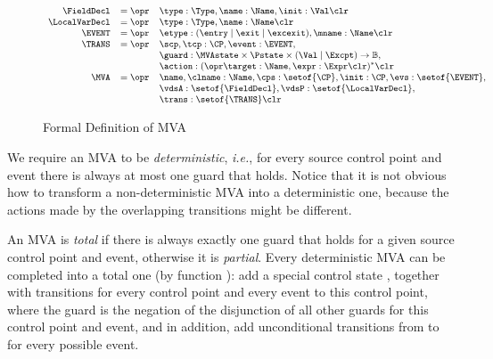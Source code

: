 \begin{figure}[t]
\[{\small
\begin{array}{rcl}
\FieldDecl & = \opr & \type : \Type, \name : \Name, \init : \Val
\clr \\
\LocalVarDecl & = \opr & \type : \Type, \name : \Name \clr \\
\EVENT & = \opr & \etype : (\entry \mid \exit \mid \excexit),
                 \mname : \Name \clr\\
\TRANS & = \opr & \scp, \tcp : \CP, \event : \EVENT, \\
& &
\guard : \MVAstate \times \Pstate \times (\Val \mid \Excpt) \rightarrow \mathbb{B}, \\
&& \action : (\opr \target : \Name, \expr : \Expr \clr)^* \clr\\
\MVA & = \opr & \name, \clname : \Name, \cps : \setof{\CP},
            \init : \CP, \evs : \setof{\EVENT},\\
     &   &  \vdsA : \setof{\FieldDecl}, \vdsP : \setof{\LocalVarDecl},\\
     &   &  \trans : \setof{\TRANS} \clr
\end{array}}
\]
\caption{Formal Definition of MVA}\label{FigMVAForm}
\end{figure}

We require an MVA to be \emph{deterministic}, \emph{i.e.}, for every
source control point and event there is always at most one guard that
holds. Notice that it is not obvious how to transform a
non-deterministic MVA into a deterministic one, because the actions
made by the overlapping transitions might be different.

An MVA is \emph{total} if there is always exactly one guard that holds
for a given source control point and event, otherwise it is
\emph{partial}. Every deterministic MVA can be completed into a total
one (by function \complete): add a special control state
\halted, together with transitions for every control point and every event
to this \halted control point, where the guard is the negation of the
disjunction of all other guards for this control point and event, and
in addition, add unconditional transitions from \halted to \halted
for every possible event.


